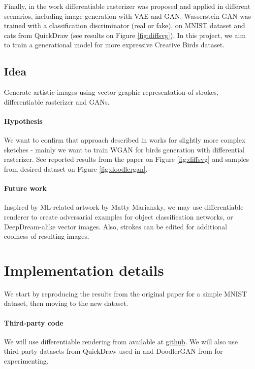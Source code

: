 \documentclass{article}
\begin{document}
Finally, in the work \cite{diffsvg} differentiable rasterizer was proposed and applied in different scenarios, including image generation with VAE and GAN. Wasserstein GAN was trained with a classification discriminator (real or fake), on MNIST dataset and cats from QuickDraw (see results on Figure \ref{fig:diffsvg}). In this project, we aim to train a generational model for more expressive Creative Birds dataset.

\subsection{Idea}
Generate artistic images using vector-graphic representation of strokes, differentiable rasterizer and GANs.

\paragraph{Hypothesis} We want to confirm that approach described in \cite{diffsvg} works for slightly more complex sketches - mainly we want to train WGAN for birds generation with differential rasterizer. See reported results from the paper on Figure \ref{fig:diffsvg} and samples from desired dataset on Figure \ref{fig:doodlergan}.

\paragraph{Future work} Inspired by ML-related artwork by Matty Mariansky, we may use differentiable renderer to create adversarial examples for object classification networks, or DeepDream-alike vector images. Also, strokes can be edited for additional coolness of resulting images. 

\section{Implementation details}
We start by reproducing the results from the original paper for a simple MNIST dataset, then moving to the new dataset.

\paragraph{Third-party code} We will use differentiable rendering from \cite{diffsvg} available at \href{https://github.com/BachiLi/diffvg}{github}. We will also use third-party datasets from QuickDraw used in \cite{sketchrnn} and DoodlerGAN from \cite{doodlergan} for experimenting.
\end{document}
